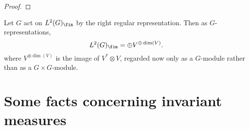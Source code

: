 \documentclass[reqno]{amsart} 
\begin{document}
\begin{proof}
\end{proof}

\begin{corollary}
  Let $G$ act on $L^2(G)_{\fin}$
  by the right regular representation.
  Then as $G$-representations,
  \begin{equation*}
  L^2(G)_{\fin}
  = \oplus V^{\oplus \dim(V)}.
  \end{equation*}
  where $V^{\oplus \dim(V)}$ is the image of $V^* \otimes V$,
  regarded now only as a $G$-module rather than as a $G \times G$-module.
\end{corollary}

\section{Some facts concerning invariant measures\label{sec:inv-measures}}
\label{sec:org22598a8}
\end{document}
